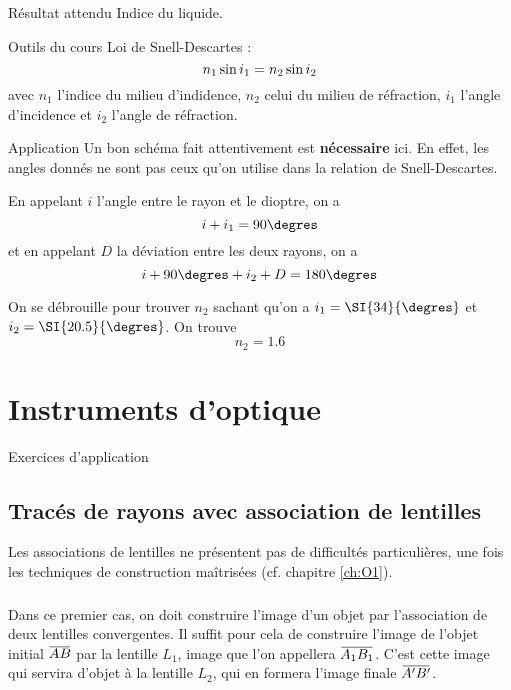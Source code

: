 \documentclass[10pt,a5paper,notitlepage]{book}
\begin{document}
\begin{NCprop}{Résultat attendu}
    Indice du liquide.
\end{NCprop}

\begin{NCdemo}{Outils du cours}
    Loi de Snell-Descartes :
    \[ n_1\ss i_1 = n_2 \ss i_2 \]
    avec $n_1$ l'indice du milieu d'indidence, $n_2$ celui du milieu de
    réfraction, $i_1$ l'angle d'incidence et $i_2$ l'angle de réfraction.
\end{NCdemo}

\begin{NCexem}{Application}
    Un bon schéma fait attentivement est \textbf{nécessaire} ici. En effet,
    les angles donnés ne sont pas ceux qu'on utilise dans la relation de
    Snell-Descartes. \bigbreak
    
    En appelant $i$ l'angle entre le rayon et le dioptre, on a
    \[ i + i_1 = 90\degres\]
    et en appelant $D$ la déviation entre les deux rayons, on a
    \[ i + 90\degres + i_2 + D = 180\degres\]

    On se débrouille pour trouver $n_2$ sachant qu'on a $i_1 = \SI{34}{\degres}$
    et $i_2 = \SI{20.5}{\degres}$. On trouve
    \[ \boxed{n_2 = 1.6} \]
\end{NCexem}

\chapter{Instruments d'optique}
\vspace*{-47pt}
\begin{center}
    \Huge Exercices d'application
\end{center}
\section{Tracés de rayons avec association de lentilles}
Les associations de lentilles ne présentent pas de difficultés particulières,
une fois les techniques de construction maîtrisées (cf. chapitre \ref{ch:O1}).

\subsection{}
Dans ce premier cas, on doit construire l'image d'un objet  par
l'association de deux lentilles convergentes. Il suffit pour cela de construire
l'image de l'objet initial $\ABb$ par la lentille $L_1$, image que l'on appellera
$\ABa$. C'est cette image qui servira d'objet à la lentille $L_2$, qui en
formera l'image finale $\ABp$. \bigbreak
\end{document}

